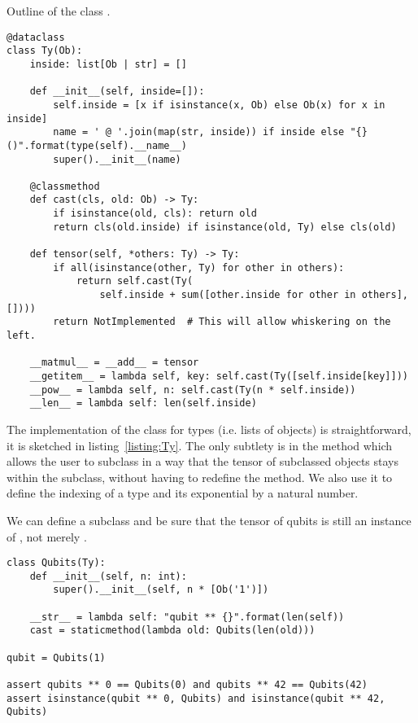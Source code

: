 \begin{python}\label{listing:Ty}
{\normalfont Outline of the class .}
\begin{verbatim}
@dataclass
class Ty(Ob):
    inside: list[Ob | str] = []

    def __init__(self, inside=[]):
        self.inside = [x if isinstance(x, Ob) else Ob(x) for x in inside]
        name = ' @ '.join(map(str, inside)) if inside else "{}()".format(type(self).__name__)
        super().__init__(name)

    @classmethod
    def cast(cls, old: Ob) -> Ty:
        if isinstance(old, cls): return old
        return cls(old.inside) if isinstance(old, Ty) else cls(old)

    def tensor(self, *others: Ty) -> Ty:
        if all(isinstance(other, Ty) for other in others):
            return self.cast(Ty(
                self.inside + sum([other.inside for other in others], [])))
        return NotImplemented  # This will allow whiskering on the left.

    __matmul__ = __add__ = tensor
    __getitem__ = lambda self, key: self.cast(Ty([self.inside[key]]))
    __pow__ = lambda self, n: self.cast(Ty(n * self.inside))
    __len__ = lambda self: len(self.inside)
\end{verbatim}
\end{python}

The implementation of the class  for types (i.e. lists of objects) is straightforward, it is sketched in listing~\ref{listing:Ty}.
The only subtlety is in the method  which allows the user to subclass  in a way that the tensor of subclassed objects stays within the subclass, without having to redefine the  method.
We also use it to define the indexing of a type and its exponential by a natural number.

\begin{example}
We can define a  subclass and be sure that the tensor of qubits is still an instance of , not merely .

\begin{verbatim}
class Qubits(Ty):
    def __init__(self, n: int):
        super().__init__(self, n * [Ob('1')])

    __str__ = lambda self: "qubit ** {}".format(len(self))
    cast = staticmethod(lambda old: Qubits(len(old)))

qubit = Qubits(1)

assert qubits ** 0 == Qubits(0) and qubits ** 42 == Qubits(42)
assert isinstance(qubit ** 0, Qubits) and isinstance(qubit ** 42, Qubits)
\end{verbatim}
\end{example}

